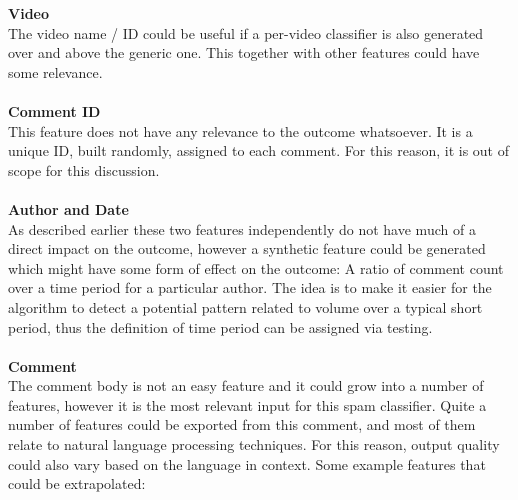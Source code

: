 \textbf{Video}
\\
The video name / ID could be useful if a per-video classifier is also generated over and above the generic one. This together with other features could have some relevance.
\\
\\
\textbf{Comment ID}
\\
This feature does not have any relevance to the outcome whatsoever. It is a unique ID, built randomly, assigned to each comment. For this reason, it is out of scope for this discussion.
\\
\\
\textbf{Author and Date}
\\
As described earlier these two features independently do not have much of a direct impact on the outcome, however a synthetic feature could be generated which might have some form of effect on the outcome: A ratio of comment count over a time period for a particular author.
The idea is to make it easier for the algorithm to detect a potential pattern related to volume over a typical short period, thus the definition of time period can be assigned via testing.
\\
\\
\textbf{Comment}
\\
The comment body is not an easy feature and it could grow into a number of features, however it is the most relevant input for this spam classifier.
Quite a number of features could be exported from this comment, and most of them relate to natural language processing techniques. For this reason, output quality could also vary based on the language in context.
Some example features that could be extrapolated:

